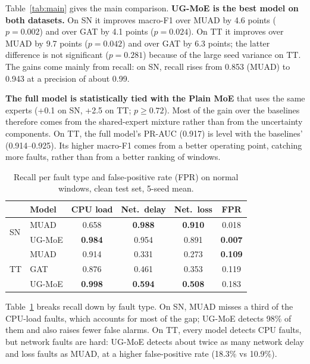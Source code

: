 \documentclass[journal]{IEEEtran}
\newcommand{\best}[1]{\textbf{#1}}
\newcommand{\ugmoe}{UG-MoE}
\begin{document}
Table~\ref{tab:main} gives the main comparison. \textbf{\ugmoe{} is the best model on both datasets.} On SN
it improves macro-F1 over MUAD by 4.6 points ($p=0.002$) and over GAT by 4.1 points ($p=0.024$). On TT it
improves over MUAD by 9.7 points ($p=0.042$) and over GAT by 6.3 points; the latter difference is not
significant ($p=0.281$) because of the large seed variance on TT. The gains come mainly from recall: on SN,
recall rises from 0.853 (MUAD) to 0.943 at a precision of about 0.99.

\textbf{The full model is statistically tied with the Plain MoE} that uses the same experts (+0.1 on SN,
+2.5 on TT; $p\geq0.72$). Most of the gain over the baselines therefore comes from the shared-expert
mixture rather than from the uncertainty components. On TT, the full model's PR-AUC (0.917) is level with
the baselines' (0.914--0.925). Its higher macro-F1 comes from a better operating point, catching more faults,
rather than from a better ranking of windows.

\begin{table}[!t]
\caption{Recall per fault type and false-positive rate (FPR) on normal windows, clean test set, 5-seed mean.}
\label{tab:types}
\centering
\footnotesize
\setlength{\tabcolsep}{3.5pt}
\begin{tabular}{@{}llcccc@{}}
\toprule
& Model & CPU load & Net.\ delay & Net.\ loss & FPR \\
\midrule
\multirow{2}{*}{SN} & MUAD & 0.658 & \best{0.988} & \best{0.910} & 0.018 \\
                    & \ugmoe{} & \best{0.984} & 0.954 & 0.891 & \best{0.007} \\
\midrule
\multirow{3}{*}{TT} & MUAD & 0.914 & 0.331 & 0.273 & \best{0.109} \\
                    & GAT & 0.876 & 0.461 & 0.353 & 0.119 \\
                    & \ugmoe{} & \best{0.998} & \best{0.594} & \best{0.508} & 0.183 \\
\bottomrule
\end{tabular}
\end{table}

Table~\ref{tab:types} breaks recall down by fault type. On SN, MUAD misses a third of the CPU-load faults,
which accounts for most of the gap; \ugmoe{} detects 98\% of them and also raises fewer false alarms. On TT,
every model detects CPU faults, but network faults are hard: \ugmoe{} detects about twice as many network
delay and loss faults as MUAD, at a higher false-positive rate (18.3\% vs 10.9\%).
\end{document}
